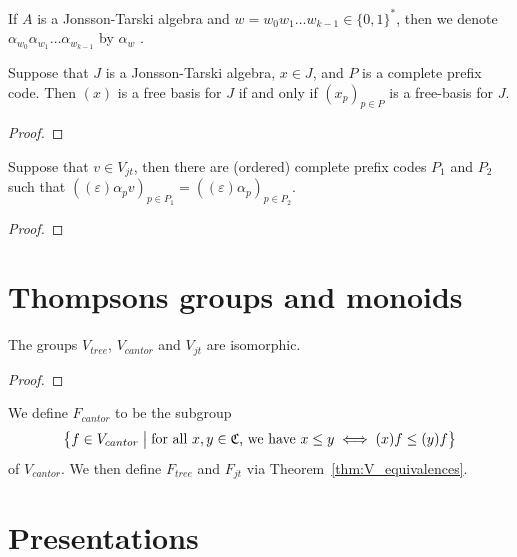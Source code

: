 \begin{definition}\label{def:string_alphas}
    If \(A\) is a Jonsson-Tarski algebra and \(w=w_0w_1\ldots w_{k-1}\in \{0,1\}^*\), then we denote \(\alpha_{w_0}\alpha_{w_1}\ldots \alpha_{w_{k-1}}\) by \(\alpha_w\) .
\end{definition}
\begin{lemma}\label{lem:free_base_manip_codes}
    Suppose that \(J\) is a Jonsson-Tarski algebra, \(x\in J\), and \(P\) is a complete prefix code.
    Then \((x)\) is a free basis for \(J\) if and only if \((x_p)_{p\in P}\) is a free-basis for \(J\).
\end{lemma}
\begin{proof}
\end{proof}

\begin{lemma}\label{lem:finding_free_bases}
    Suppose that \(v\in V_{jt}\), then there are (ordered) complete prefix codes \(P_1\) and \(P_2\) such that \(((\varepsilon)\alpha_{p} v)_{p\in P_1}=((\varepsilon)\alpha_{p})_{p\in P_2}\).
\end{lemma}
\begin{proof}
\end{proof}


\chapter{Thompsons groups and monoids}

\begin{theorem}\label{thm:V_equivalences}
    The groups \(V_{tree}\), \(V_{cantor}\) and \(V_{jt}\) are isomorphic.
\end{theorem}
\begin{proof}
\end{proof}
\begin{definition}\label{def:F}
    We define \(F_{cantor}\) to be the subgroup \[\makeset{f\in V_{cantor}}{for all \(x,y\in \mathfrak{C}\), we have \(x\leq y \iff (x)f\leq (y)f\)}\]
    of \(V_{cantor}\). We then define \(F_{tree}\) and \(F_{jt}\) via Theorem~\ref{thm:V_equivalences}.
\end{definition}
\chapter{Presentations}
